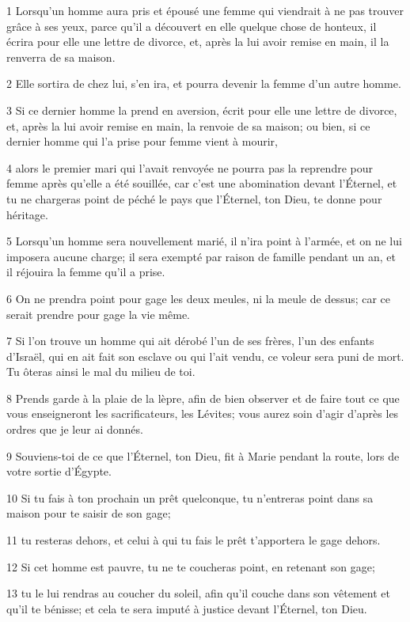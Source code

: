 \par 1 Lorsqu'un homme aura pris et épousé une femme qui viendrait à ne pas trouver grâce à ses yeux, parce qu'il a découvert en elle quelque chose de honteux, il écrira pour elle une lettre de divorce, et, après la lui avoir remise en main, il la renverra de sa maison.
\par 2 Elle sortira de chez lui, s'en ira, et pourra devenir la femme d'un autre homme.
\par 3 Si ce dernier homme la prend en aversion, écrit pour elle une lettre de divorce, et, après la lui avoir remise en main, la renvoie de sa maison; ou bien, si ce dernier homme qui l'a prise pour femme vient à mourir,
\par 4 alors le premier mari qui l'avait renvoyée ne pourra pas la reprendre pour femme après qu'elle a été souillée, car c'est une abomination devant l'Éternel, et tu ne chargeras point de péché le pays que l'Éternel, ton Dieu, te donne pour héritage.
\par 5 Lorsqu'un homme sera nouvellement marié, il n'ira point à l'armée, et on ne lui imposera aucune charge; il sera exempté par raison de famille pendant un an, et il réjouira la femme qu'il a prise.
\par 6 On ne prendra point pour gage les deux meules, ni la meule de dessus; car ce serait prendre pour gage la vie même.
\par 7 Si l'on trouve un homme qui ait dérobé l'un de ses frères, l'un des enfants d'Israël, qui en ait fait son esclave ou qui l'ait vendu, ce voleur sera puni de mort. Tu ôteras ainsi le mal du milieu de toi.
\par 8 Prends garde à la plaie de la lèpre, afin de bien observer et de faire tout ce que vous enseigneront les sacrificateurs, les Lévites; vous aurez soin d'agir d'après les ordres que je leur ai donnés.
\par 9 Souviens-toi de ce que l'Éternel, ton Dieu, fit à Marie pendant la route, lors de votre sortie d'Égypte.
\par 10 Si tu fais à ton prochain un prêt quelconque, tu n'entreras point dans sa maison pour te saisir de son gage;
\par 11 tu resteras dehors, et celui à qui tu fais le prêt t'apportera le gage dehors.
\par 12 Si cet homme est pauvre, tu ne te coucheras point, en retenant son gage;
\par 13 tu le lui rendras au coucher du soleil, afin qu'il couche dans son vêtement et qu'il te bénisse; et cela te sera imputé à justice devant l'Éternel, ton Dieu.
